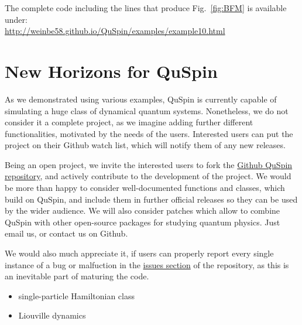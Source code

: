 \documentclass{SciPost}
\newcommand\0{\scalebox{-1}[1]{0}}
\begin{document}
The complete code including the lines that produce Fig.~\ref{fig:BFM} is available under:\\

\href{http://weinbe58.github.io/QuSpin/examples/example10.html}{http://weinbe58.github.io/QuSpin/examples/example10.html}\\



\section{New Horizons for QuSpin}
\label{sec:outro}
As we demonstrated using various examples, QuSpin is currently capable of simulating a huge class of dynamical quantum systems. Nonetheless, we do not consider it a complete project, as we imagine adding further different functionalities, motivated by the needs of the users. Interested users can put the project on their Github watch list, which will notify them of any new releases.

Being an open project, we invite the interested users to fork the \href{https://github.com/weinbe58/QuSpin}{Github QuSpin repository}, and actively contribute to the development of the project. We would be more than happy to consider well-documented functions and classes, which build on QuSpin, and include them in further official releases so they can be used by the wider audience. We will also consider patches which allow to combine QuSpin with other open-source packages for studying quantum physics. Just email us, or contact us on Github.

We would also much appreciate it, if users can properly report every single instance of a bug or malfuction in the \href{https://github.com/weinbe58/QuSpin/issues}{issues section} of the repository, as this is an inevitable part of maturing the code.    

\begin{itemize}
	\item single-particle Hamiltonian class
	\item Liouville dynamics
\end{itemize}
 
\end{document}
